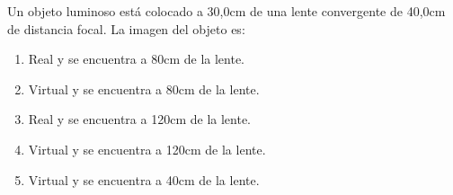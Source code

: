 
Un objeto luminoso está colocado a 30,0cm de una lente convergente de 40,0cm de distancia focal. La imagen del objeto es:
\begin{enumerate}
    \item Real y se encuentra a 80cm de la lente.
    \item Virtual y se encuentra a 80cm de la lente.
    \item Real y se encuentra a 120cm de la lente.
    \item Virtual y se encuentra a 120cm de la lente.
    \item Virtual y se encuentra a 40cm de la lente.
\end{enumerate}